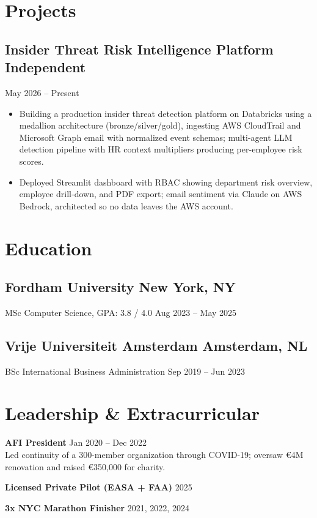 \documentclass[9pt,letterpaper]{article}
\begin{document}
\section{Projects}
\subsection{Insider Threat Risk Intelligence Platform \hfill Independent}
May 2026 -- Present
\begin{itemize}
\item Building a production insider threat detection platform on Databricks using a medallion architecture (bronze/silver/gold), ingesting AWS CloudTrail and Microsoft Graph email with normalized event schemas; multi-agent LLM detection pipeline with HR context multipliers producing per-employee risk scores.
\item Deployed Streamlit dashboard with RBAC showing department risk overview, employee drill-down, and PDF export; email sentiment via Claude on AWS Bedrock, architected so no data leaves the AWS account.
\end{itemize}
\section{Education}
\subsection{Fordham University \hfill New York, NY}
MSc Computer Science, GPA: 3.8 / 4.0 \hfill Aug 2023 -- May 2025
\subsection{Vrije Universiteit Amsterdam \hfill Amsterdam, NL}
BSc International Business Administration \hfill Sep 2019 -- Jun 2023
\section{Leadership \& Extracurricular}
\textbf{AFI President} \hfill Jan 2020 -- Dec 2022 \\
Led continuity of a 300-member organization through COVID-19; oversaw \euro4M renovation and raised \euro350,000 for charity.
\vspace{1pt}

\textbf{Licensed Private Pilot (EASA + FAA)} \hfill 2025
\vspace{1pt}

\textbf{3x NYC Marathon Finisher} \hfill 2021, 2022, 2024
\vspace{1pt}
\end{document}
